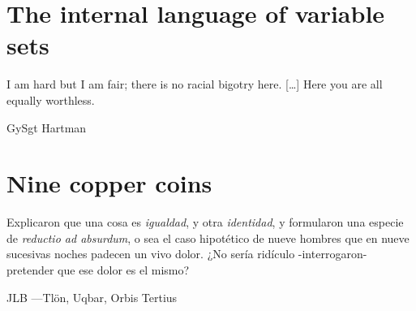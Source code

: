 \documentclass{amsart}
\begin{document}
\section{The internal language of variable sets}
\epigraph{I am hard but I am fair; there is no racial bigotry here. [\dots\unkern] Here you are all equally worthless.}{GySgt Hartman}
\section{Nine copper coins}
\epigraph{Explicaron que una cosa es \emph{igualdad}, y otra \emph{identidad}, y formularon una especie de \emph{reductio ad absurdum}, o sea el caso hipotético de nueve hombres que en nueve sucesivas noches
padecen un vivo dolor. ¿No sería ridículo -interrogaron- pretender que ese dolor es el
mismo?}{JLB ---Tl\"on, Uqbar, Orbis Tertius}
\end{document}

